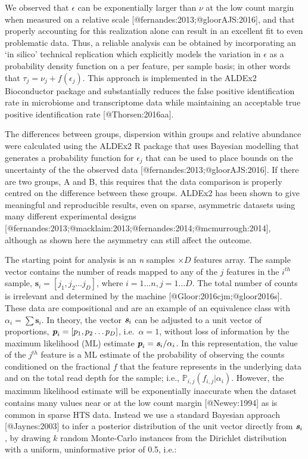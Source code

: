 \documentclass[
  onecolumn]{article}
\begin{document}
We observed that \(\epsilon\) can be exponentially larger than \(\nu\) at the low count margin when measured on a relative scale {[}@fernandes:2013;@gloorAJS:2016{]}, and that properly accounting for this realization alone can result in an excellent fit to even problematic data. Thus, a reliable analysis can be obtained by incorporating an `in silico' technical replication which explicitly models the variation in \(\epsilon\) as a probability density function on a per feature, per sample basis; in other words that \(\tau_{j} = \nu_j + f(\epsilon_{j})\). This approach is implemented in the ALDEx2 Bioconductor package and substantially reduces the false positive identification rate in microbiome and transcriptome data while maintaining an acceptable true positive identification rate {[}@Thorsen:2016aa{]}.

The differences between groups, dispersion within groups and relative abundance were calculated using the ALDEx2 R package that uses Bayesian modelling that generates a probability function for \(\epsilon_j\) that can be used to place bounds on the uncertainty of the the observed data {[}@fernandes:2013;@gloorAJS:2016{]}. If there are two groups, A and B, this requires that the data comparison is properly centred on the difference between these groups. ALDEx2 has been shown to give meaningful and reproducible results, even on sparse, asymmetric datasets using many different experimental designs {[}@fernandes:2013;@macklaim:2013;@fernandes:2014;@mcmurrough:2014{]}, although as shown here the asymmetry can still affect the outcome.

The starting point for analysis is an \emph{n} samples \(\times D\) features array. The sample vector contains the number of reads mapped to any of the \(j\) features in the \(i^{th}\) sample, \(\textbf{s}_i=[j_1,j_2 \ldots j_D]\), where \(i=1 \ldots n , j=1 \ldots D\). The total number of counts is irrelevant and determined by the machine {[}@Gloor:2016cjm;@gloor2016s{]}. These data are compositional and are an example of an equivalence class with \(\alpha_{i} = \sum \textbf{s}_{i}\). In theory, the vector \(\textit{\textbf{s}}_i\) can be adjusted to a unit vector of proportions, \({\textit{\textbf{p}}_i=[p_1,p_2 \ldots p_D] }\), i.e.~\(\alpha=1\), without loss of information by the maximum likelihood (ML) estimate \(\textit{\textbf{p}}_i=\textit{\textbf{s}}_i / \alpha_{i}\). In this representation, the value of the \(j^{th}\) feature is a ML estimate of the probability of observing the counts conditioned on the fractional \(f\) that the feature represents in the underlying data and on the total read depth for the sample; i.e., \(\mathbb{P}_{i,j}(f_{i,j}|\alpha_i)\). However, the maximum likelihood estimate will be exponentially inaccurate when the dataset contains many values near or at the low count margin {[}@Newey:1994{]} as is common in sparse HTS data. Instead we use a standard Bayesian approach {[}@Jaynes:2003{]} to infer a posterior distribution of the unit vector directly from \(\textit{\textbf{s}}_i\), by drawing \(k\) random Monte-Carlo instances from the Dirichlet distribution with a uniform, uninformative prior of 0.5, i.e.:
\end{document}
